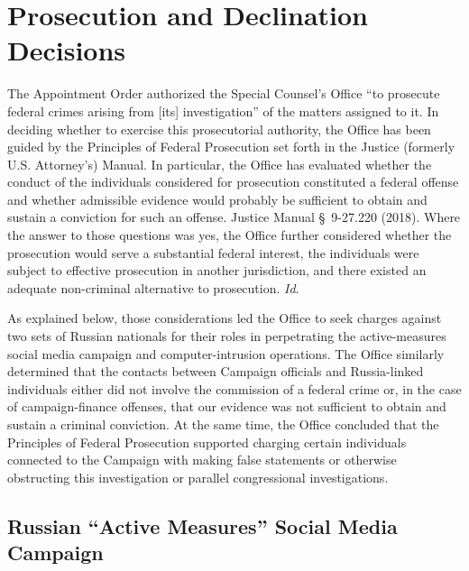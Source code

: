 \section{Prosecution and Declination Decisions}

The Appointment Order authorized the Special Counsel's Office ``to prosecute federal crimes arising from [its] investigation'' of the matters assigned to it.
In deciding whether to exercise this prosecutorial authority, the Office has been guided by the Principles of Federal Prosecution set forth in the Justice (formerly U.S. Attorney's) Manual.
In particular, the Office has evaluated whether the conduct of the individuals considered for prosecution constituted a federal offense and whether admissible evidence would probably be sufficient to obtain and sustain a conviction for such an offense.
Justice Manual \S~9-27.220 (2018).
Where the answer to those questions was yes, the Office further considered whether the prosecution would serve a substantial federal interest, the individuals were subject to effective prosecution in another jurisdiction, and there existed an adequate non-criminal alternative to prosecution.
\textit{Id}.

As explained below, those considerations led the Office to seek charges against two sets of Russian nationals for their roles in perpetrating the active-measures social media campaign and computer-intrusion operations.
The Office similarly determined that the contacts between Campaign officials and Russia-linked individuals either did not involve the commission of a federal crime or, in the case of campaign-finance offenses, that our evidence was not sufficient to obtain and sustain a criminal conviction.
At the same time, the Office concluded that the Principles of Federal Prosecution supported charging certain individuals connected to the Campaign with making false statements or otherwise obstructing this investigation or parallel congressional investigations.

\subsection{Russian ``Active Measures'' Social Media Campaign}

